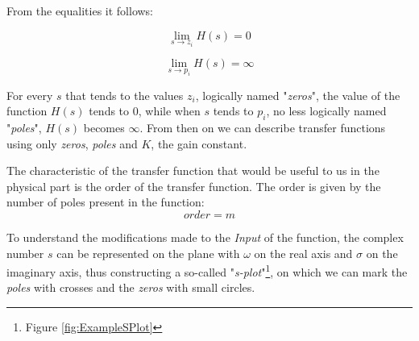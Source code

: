 \documentclass[a4paper, 10pt, final]{article} %
\begin{document}
    \noindent From the equalities it follows:
    \begin{figure}[H]
        \centering
        \begin{minipage}[b]{.3\linewidth}
            \centering
            \[
                \lim_{s \to z_i} H(s) = 0
            \]
        \end{minipage}
        \hspace{0.04\linewidth}
        \begin{minipage}[b]{.3\linewidth}
            \centering
            \[
                \lim_{s \to p_i} H(s) = \infty
            \]
        \end{minipage}
    \end{figure}
    \noindent For every $s$ that tends to the values $z_i$, logically named "\emph{zeros}", the value of the function $H(s)$ tends to $0$, while when $s$ tends to $p_i$, no less logically named "\emph{poles}", $H(s)$ becomes $\infty$.
    From then on we can describe transfer functions using only \emph{zeros}, \emph{poles} and $K$, the gain constant.

    The characteristic of the transfer function that would be useful to us  in the physical part is the order of the transfer function.
    The order is given by the number of poles present in the function:
    \[
        order = m
    \]

    To understand the modifications made to the \emph{Input} of the function, the complex number $s$ can be represented on the plane with $\omega$ on the real axis and $\sigma$ on the imaginary axis, thus constructing a so-called "\emph{s-plot}"\footnote{Figure \ref{fig:ExampleSPlot}}, on which we can mark the \emph{poles} with crosses and the \emph{zeros} with small circles.
\end{document}
